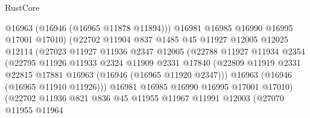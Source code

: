 \begin{lexlean}{RustCore}
\begin{coremodule}
                                  @16963
                                  (@16946 (@16965 @11878 @11894)))
                                @16981
                                @16985
                                @16990
                                @16995
                                @17001
                                @17010)
                              (@22702
                                @11904
                                @837
                                @1485
                                @45
                                @11927
                                @12005
                                @12025
                                @12114
                                (@27023
                                  @11927
                                  @11936
                                  @2347
                                  @12005
                                  (@22788
                                    @11927
                                    @11934
                                    @2354
                                    (@22795
                                      @11926
                                      @11933
                                      @2324
                                      @11909
                                      @2331
                                      @17840
                                      (@22809
                                        @11919
                                        @2331
                                        @22815
                                        @17881
                                        @16963
                                        (@16946 (@16965 @11920 @2347)))
                                      @16963
                                      (@16946 (@16965 @11910 @11926)))
                                    @16981
                                    @16985
                                    @16990
                                    @16995
                                    @17001
                                    @17010)
                                  (@22702
                                    @11936
                                    @821
                                    @836
                                    @45
                                    @11955
                                    @11967
                                    @11991
                                    @12003
                                    (@27070
                                      @11955
                                      @11964

\end{coremodule}
\end{lexlean}
